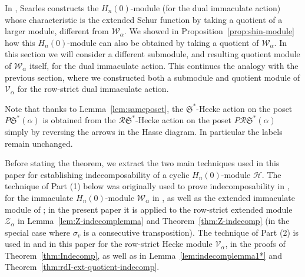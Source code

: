 \documentclass[12pt,letterpaper]{amsart}
\theoremstyle{definition}
\newcommand{\dI}{\mathfrak{S}^*}
\newcommand{\rdI}{\mathcal{R}\mathfrak{S}^*}
\newcommand{\hn}{H_n(0)}
\begin{document}
In \cite{S2020}, Searles constructs the $\hn$-module (for the dual immaculate action) whose characteristic is the extended Schur function by taking a quotient of a larger module, different from $\mathcal{W}_\alpha.$   
We showed in Proposition~\ref{prop:shin-module} how this $\hn$-module can also be obtained  by taking a quotient of $\mathcal{W}_\alpha.$
In this section we will  consider a different submodule, and resulting quotient module of $\mathcal{W}_\alpha$ itself, for the dual immaculate action.  This continues the analogy with  the previous section, where we constructed both a submodule and quotient module of $\mathcal{V}_\alpha$ for the row-strict dual immaculate action.  

Note that thanks to Lemma~\ref{lem:sameposet}, the $\dI$-Hecke action on the poset $P\dI(\alpha)$ is obtained from the $\rdI$-Hecke action on the poset $P\rdI(\alpha)$ simply by reversing the arrows in the Hasse diagram. In particular the labels remain unchanged.

Before stating the theorem, we extract the two main techniques used in this paper for establishing indecomposability of a cyclic $\hn$-module $\mathcal{H}$.  The technique of Part (1) below was originally used to prove indecomposability in \cite[Lemma~7.7, Theorem~7.8]{TvW2015}, for the  immaculate $\hn$-module $\mathcal{W}_\alpha$ in \cite[Lemma 3.11, Theorem 3.12]{BBSSZ2015}, as well as the extended immaculate module of \cite[Theorem~3.13]{S2020}; in the present paper it is applied to the row-strict extended module $\mathcal{Z}_\alpha$  in Lemma~\ref{lem:Z-indecomplemma} and Theorem~\ref{thm:Z-indecomp} (in the special case where $\sigma_v$ is a consecutive transposition).  The technique of Part (2) is used in 
\cite[Proof of Theorem~4.1]{BS2021} and in this paper for the row-strict Hecke module $\mathcal{V}_\alpha$, in the proofs of Theorem~\ref{thm:Indecomp}, as well as in Lemma~\ref{lem:indecomplemma1*} and Theorem~\ref{thm:rdI-ext-quotient-indecomp}.
\end{document}
